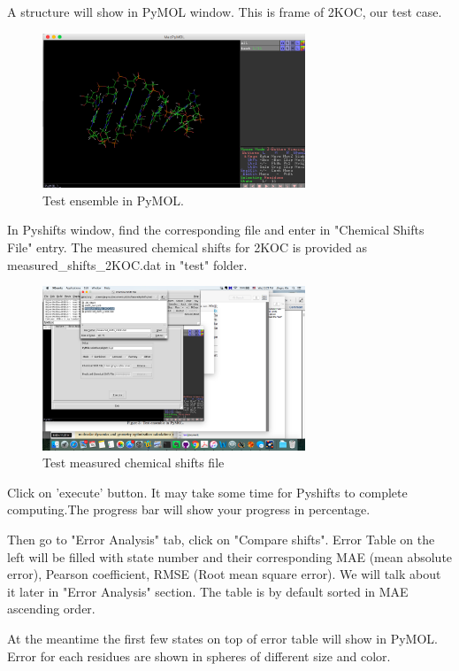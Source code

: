 \documentclass{article}
\begin{document}
A structure will show in PyMOL window. This is frame of 2KOC, our test case.
\begin{figure}[htbp]
\centering
\includegraphics[width=0.7\textwidth]{test_ensemble}
\caption{Test ensemble in PyMOL.}
\label{fig:test1}
\end{figure}

In Pyshifts window, find the corresponding file and enter in "Chemical Shifts File" entry. The measured chemical shifts for 2KOC is provided as measured\_shifts\_2KOC.dat in "test" folder. 
\begin{figure}[htbp]
\centering
\includegraphics[width=0.7\textwidth]{test2}
\caption{Test measured chemical shifts file}
\label{fig:test2}
\end{figure}

Click on 'execute' button. It may take some time for Pyshifts to complete computing.The progress bar will show your progress in percentage.

Then go to "Error Analysis" tab, click on "Compare shifts". Error Table on the left will be filled with state number and their corresponding MAE (mean absolute error), Pearson coefficient, RMSE (Root mean square error). We will talk about it later in "Error Analysis" section. The table is by default sorted in MAE ascending order.

At the meantime the first few states on top of error table will show in PyMOL. Error for each residues are shown in spheres of different size and color. 
\end{document}
